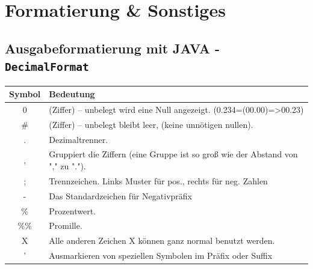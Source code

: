\documentclass[10pt,a4paper,ngerman,oneside,]{article}
\begin{document}
\section{Formatierung \& Sonstiges}
\subsection{Ausgabeformatierung mit JAVA - \texttt{DecimalFormat}}
\begin{tabular}{cl}
Symbol & Bedeutung\\\hline
0 &	(Ziffer) – unbelegt wird eine Null angezeigt. (0.234=(00.00)=>00.23)\\
\# &	(Ziffer) – unbelegt bleibt leer, (keine unnötigen nullen).\\
. &	Dezimaltrenner. \\
, &	Gruppiert die Ziffern (eine Gruppe ist so groß wie der Abstand von "," zu ".").\\
; &	Trennzeichen. Links Muster für pos., rechts für neg. Zahlen\\
- &	Das Standardzeichen für Negativpräfix\\
\% &	Prozentwert.\\
\%\% &	Promille.\\
X &	Alle anderen Zeichen X können ganz normal benutzt werden.\\
' &	Ausmarkieren von speziellen Symbolen im Präfix oder Suffix \\
\end{tabular}
\end{document}
